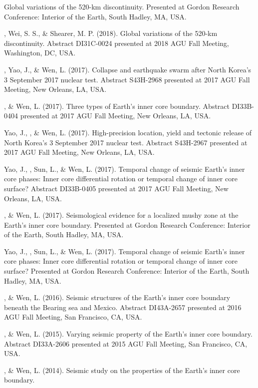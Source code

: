\begin{etaremune}
    Global variations of the 520-km discontinuity.
    Presented at Gordon Research Conference: Interior of the Earth, South Hadley, MA, USA.
\item
    \Tian, Wei, S. S., \& Shearer, M. P. (2018).
    Global variations of the 520-km discontinuity.
    Abstract DI31C-0024 presented at 2018 AGU Fall Meeting, Washington, DC, USA.
\item
    \Tian, Yao, J., \& Wen, L. (2017).
    Collapse and earthquake swarm after North Korea's 3 September 2017 nuclear test.
    Abstract S43H-2968 presented at 2017 AGU Fall Meeting, New Orleans, LA, USA.
\item
    \Tian, \& Wen, L. (2017).
    Three types of Earth's inner core boundary.
    Abstract DI33B-0404 presented at 2017 AGU Fall Meeting, New Orleans, LA, USA.
\item
    Yao, J., \Tian, \& Wen, L. (2017).
    High-precision location, yield and tectonic release of North Korea's 3 September 2017 nuclear test.
    Abstract S43H-2967 presented at 2017 AGU Fall Meeting, New Orleans, LA, USA.
\item
    Yao, J., \Tian, Sun, L., \& Wen, L. (2017).
    Temporal change of seismic Earth's inner core phases: Inner core differential rotation or temporal change of inner core surface?
    Abstract DI33B-0405 presented at 2017 AGU Fall Meeting, New Orleans, LA, USA.
\item
    \Tian, \& Wen, L. (2017).
    Seismological evidence for a localized mushy zone at the Earth's inner core boundary.
    Presented at Gordon Research Conference: Interior of the Earth, South Hadley, MA, USA.
\item
    Yao, J., \Tian, Sun, L., \& Wen, L. (2017).
    Temporal change of seismic Earth's inner core phases: Inner core differential rotation or temporal change of inner core surface?
    Presented at Gordon Research Conference: Interior of the Earth, South Hadley, MA, USA.
\item
    \Tian, \& Wen, L. (2016).
    Seismic structures of the Earth's inner core boundary beneath the Bearing sea and Mexico.
    Abstract DI43A-2657 presented at 2016 AGU Fall Meeting, San Francisco, CA, USA.
\item
    \Tian, \& Wen, L. (2015).
    Varying seismic property of the Earth's inner core boundary.
    Abstract DI33A-2606 presented at 2015 AGU Fall Meeting, San Francisco, CA, USA.
\item
    \Tian, \& Wen, L. (2014).
    Seismic study on the properties of the Earth's inner core boundary.

\end{etaremune}
